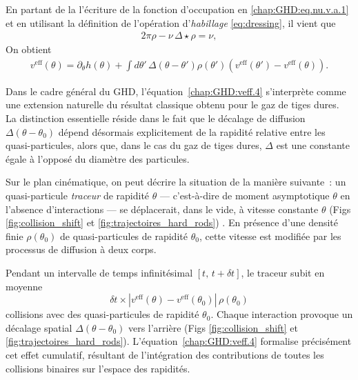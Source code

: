 En partant de la l'écriture de la fonction d'occupation en \eqref{chap:GHD:eq.nu.v.a.1} et en utilisant la définition de l'opération d’\emph{habillage} \eqref{eq:dressing}, il vient que 
\begin{eqnarray}\label{chap:GHD:veff.3}
	2 \pi \rho - \nu \, 	\Delta \star  \rho = \nu, 
\end{eqnarray}
On obtient 
\begin{eqnarray}\label{chap:GHD:veff.4}
	v^{\mathrm{eff}} ( \theta )      =  \partial_\theta h ( \theta )   +  \int d \theta' \, \Delta(\theta - \theta') \rho ( \theta') ( v^{\mathrm{eff}} ( \theta' ) - v^{\mathrm{eff}} ( \theta )  ).
\end{eqnarray}

\medskip

Dans le cadre général du \gls{GHD}, l’équation~\eqref{chap:GHD:veff.4} s’interprète comme une extension naturelle du résultat classique obtenu pour le gaz de tiges dures. La distinction essentielle réside dans le fait que le décalage de diffusion \(\Delta(\theta - \theta_0)\) dépend désormais explicitement de la rapidité relative entre les quasi-particules, alors que, dans le cas du gaz de tiges dures, \(\Delta\) est une constante égale à l’opposé du diamètre des particules.

\medskip


Sur le plan cinématique, on peut décrire la situation de la manière suivante~: un quasi-particule \emph{traceur} de rapidité \(\theta\) --- c’est-à-dire de moment asymptotique \(\theta\) en l’absence d’interactions --- se déplacerait, dans le vide, à vitesse constante \( \theta \) (Figs \ref{fig:collision_shift} et \ref{fig:trajectoires_hard_rods}) . En présence d’une densité finie \(\rho(\theta_0)\) de quasi-particules de rapidité \(\theta_0\), cette vitesse est modifiée par les processus de diffusion à deux corps.

\medskip


Pendant un intervalle de temps infinitésimal \([t,\, t + \delta t]\), le traceur subit en moyenne
\[
\delta t \times \left| v^{\mathrm{eff}}(\theta) - v^{\mathrm{eff}}(\theta_0) \right| \, \rho(\theta_0)
\]
collisions avec des quasi-particules de rapidité \(\theta_0\). Chaque interaction provoque un décalage spatial \(\Delta(\theta - \theta_0)\) vers l’arrière (Figs \ref{fig:collision_shift} et \ref{fig:trajectoires_hard_rods}). L’équation~\eqref{chap:GHD:veff.4} formalise précisément cet effet cumulatif, résultant de l’intégration des contributions de toutes les collisions binaires sur l’espace des rapidités.

